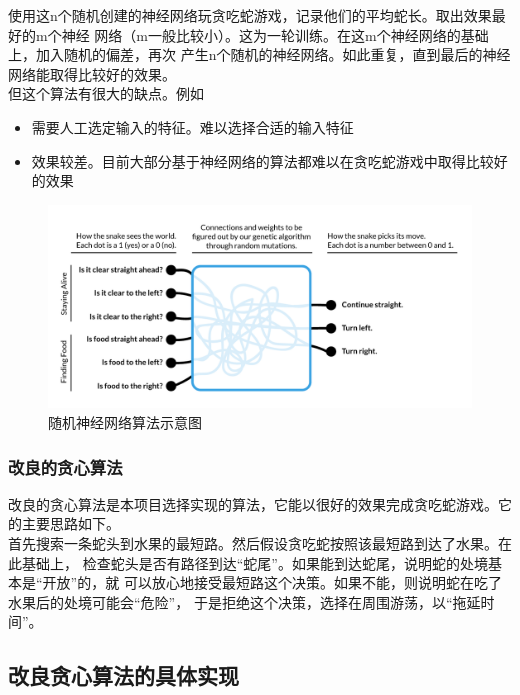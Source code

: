 \documentclass[a4paper]{article}
\begin{document}
使用这n个随机创建的神经网络玩贪吃蛇游戏，记录他们的平均蛇长。取出效果最好的m个神经
网络（m一般比较小）。这为一轮训练。在这m个神经网络的基础上，加入随机的偏差，再次
产生n个随机的神经网络。如此重复，直到最后的神经网络能取得比较好的效果。\\

但这个算法有很大的缺点。例如
\begin{itemize}
    \item 需要人工选定输入的特征。难以选择合适的输入特征
    \item 效果较差。目前大部分基于神经网络的算法都难以在贪吃蛇游戏中取得比较好的效果
\end{itemize}
\begin{figure}[!hbt]
    \begin{center}
    \includegraphics[scale=0.3]{assets/random-network.png}
    \caption{随机神经网络算法示意图\label{fig:random-network}} 
    \end{center} 
\end{figure} 

\subsubsection{改良的贪心算法}\label{subsec:refine-greedy}
改良的贪心算法是本项目选择实现的算法，它能以很好的效果完成贪吃蛇游戏。它的主要思路如下。\\


首先搜索一条蛇头到水果的最短路。然后假设贪吃蛇按照该最短路到达了水果。在此基础上，
检查蛇头是否有路径到达``蛇尾''。如果能到达蛇尾，说明蛇的处境基本是``开放''的，就
可以放心地接受最短路这个决策。如果不能，则说明蛇在吃了水果后的处境可能会``危险''， 
于是拒绝这个决策，选择在周围游荡，以``拖延时间''。

\subsection{改良贪心算法的具体实现}
\end{document}
